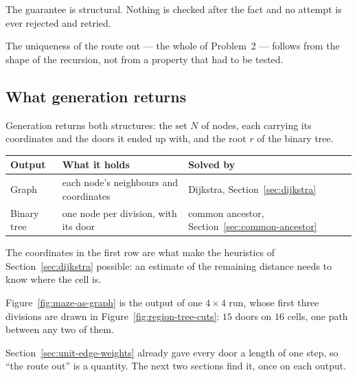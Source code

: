 The guarantee is structural. Nothing is checked after the fact and no attempt is
ever rejected and retried.

The uniqueness of the route out --- the whole of Problem~2 --- follows from the
shape of the recursion, not from a property that had to be tested.

\subsection{What generation returns}

Generation returns both structures: the set $N$ of nodes, each carrying its
coordinates and the doors it ended up with, and the root $r$ of the binary
tree.

\begin{center}
\begin{tabular}{@{}lll@{}}
  \toprule
  Output & What it holds & Solved by \\
  \midrule
  Graph & each node's neighbours and coordinates
        & Dijkstra, Section~\ref{sec:dijkstra} \\
  Binary tree & one node per division, with its door
        & common ancestor, Section~\ref{sec:common-ancestor} \\
  \bottomrule
\end{tabular}
\end{center}

The coordinates in the first row are what make the heuristics of
Section~\ref{sec:dijkstra} possible: an estimate of the remaining distance
needs to know where the cell is.

Figure~\ref{fig:maze-as-graph} is the output of one $4\times4$ run, whose first
three divisions are drawn in Figure~\ref{fig:region-tree-cuts}: $15$ doors on
$16$ cells, one path between any two of them.

Section~\ref{sec:unit-edge-weights} already gave every door a length of one
step, so ``the route out'' is a quantity. The next two sections find it, once
on each output.
